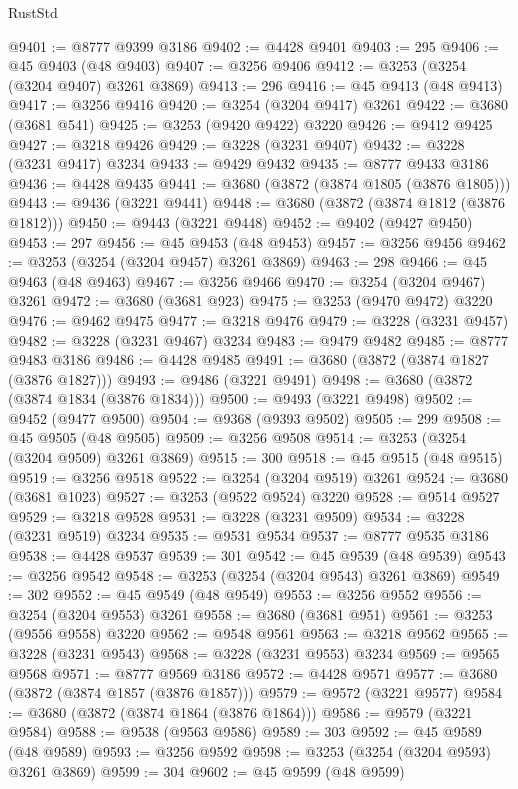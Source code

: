 \begin{lexlean}{RustStd}
\begin{coremodule}
{\begin{coremodule}
{{{{{{{{{{{{{{{{{{{{{{{{{{{{{{{{{{{{{@9401 := @8777 @9399 @3186
@9402 := @4428 @9401
@9403 := 295
@9406 := @45 @9403 (@48 @9403)
@9407 := @3256 @9406
@9412 := @3253 (@3254 (@3204 @9407) @3261 @3869)
@9413 := 296
@9416 := @45 @9413 (@48 @9413)
@9417 := @3256 @9416
@9420 := @3254 (@3204 @9417) @3261
@9422 := @3680 (@3681 @541)
@9425 := @3253 (@9420 @9422) @3220
@9426 := @9412 @9425
@9427 := @3218 @9426
@9429 := @3228 (@3231 @9407)
@9432 := @3228 (@3231 @9417) @3234
@9433 := @9429 @9432
@9435 := @8777 @9433 @3186
@9436 := @4428 @9435
@9441 := @3680 (@3872 (@3874 @1805 (@3876 @1805)))
@9443 := @9436 (@3221 @9441)
@9448 := @3680 (@3872 (@3874 @1812 (@3876 @1812)))
@9450 := @9443 (@3221 @9448)
@9452 := @9402 (@9427 @9450)
@9453 := 297
@9456 := @45 @9453 (@48 @9453)
@9457 := @3256 @9456
@9462 := @3253 (@3254 (@3204 @9457) @3261 @3869)
@9463 := 298
@9466 := @45 @9463 (@48 @9463)
@9467 := @3256 @9466
@9470 := @3254 (@3204 @9467) @3261
@9472 := @3680 (@3681 @923)
@9475 := @3253 (@9470 @9472) @3220
@9476 := @9462 @9475
@9477 := @3218 @9476
@9479 := @3228 (@3231 @9457)
@9482 := @3228 (@3231 @9467) @3234
@9483 := @9479 @9482
@9485 := @8777 @9483 @3186
@9486 := @4428 @9485
@9491 := @3680 (@3872 (@3874 @1827 (@3876 @1827)))
@9493 := @9486 (@3221 @9491)
@9498 := @3680 (@3872 (@3874 @1834 (@3876 @1834)))
@9500 := @9493 (@3221 @9498)
@9502 := @9452 (@9477 @9500)
@9504 := @9368 (@9393 @9502)
@9505 := 299
@9508 := @45 @9505 (@48 @9505)
@9509 := @3256 @9508
@9514 := @3253 (@3254 (@3204 @9509) @3261 @3869)
@9515 := 300
@9518 := @45 @9515 (@48 @9515)
@9519 := @3256 @9518
@9522 := @3254 (@3204 @9519) @3261
@9524 := @3680 (@3681 @1023)
@9527 := @3253 (@9522 @9524) @3220
@9528 := @9514 @9527
@9529 := @3218 @9528
@9531 := @3228 (@3231 @9509)
@9534 := @3228 (@3231 @9519) @3234
@9535 := @9531 @9534
@9537 := @8777 @9535 @3186
@9538 := @4428 @9537
@9539 := 301
@9542 := @45 @9539 (@48 @9539)
@9543 := @3256 @9542
@9548 := @3253 (@3254 (@3204 @9543) @3261 @3869)
@9549 := 302
@9552 := @45 @9549 (@48 @9549)
@9553 := @3256 @9552
@9556 := @3254 (@3204 @9553) @3261
@9558 := @3680 (@3681 @951)
@9561 := @3253 (@9556 @9558) @3220
@9562 := @9548 @9561
@9563 := @3218 @9562
@9565 := @3228 (@3231 @9543)
@9568 := @3228 (@3231 @9553) @3234
@9569 := @9565 @9568
@9571 := @8777 @9569 @3186
@9572 := @4428 @9571
@9577 := @3680 (@3872 (@3874 @1857 (@3876 @1857)))
@9579 := @9572 (@3221 @9577)
@9584 := @3680 (@3872 (@3874 @1864 (@3876 @1864)))
@9586 := @9579 (@3221 @9584)
@9588 := @9538 (@9563 @9586)
@9589 := 303
@9592 := @45 @9589 (@48 @9589)
@9593 := @3256 @9592
@9598 := @3253 (@3254 (@3204 @9593) @3261 @3869)
@9599 := 304
@9602 := @45 @9599 (@48 @9599)
}}}}}}}}}}}}}}}}}}}}}}}}}}}}}}}}}}}}}
\end{coremodule}}
\end{coremodule}
\end{lexlean}
